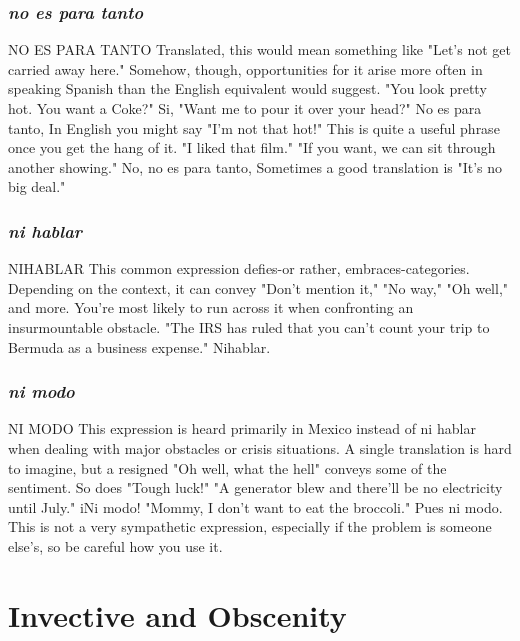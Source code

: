 \documentclass[14pt,a4paper,oneside]{memoir}
\begin{document}
\subsection{\emph{no es para tanto}}
NO ES PARA TANTO
Translated, this would mean something like "Let's not get carried away here." Somehow, though, opportunities for it arise more often in speaking Spanish than the English equivalent would suggest.
"You look pretty hot. You want a Coke?" Si, "Want me to pour it over
your head?" No es para tanto, In English you might say "I'm not that
hot!" This is quite a useful phrase once you get the hang of it. "I liked
that film." "If you want, we can sit through another showing." No, no
es para tanto, Sometimes a good translation is "It's no big deal."
\subsection{\emph{ni hablar}}
NIHABLAR
This common expression defies-or rather, embraces-categories. Depending on the context, it can convey "Don't mention it,"
"No way," "Oh well," and more. You're most likely to run across it
when confronting an insurmountable obstacle. "The IRS has ruled
that you can't count your trip to Bermuda as a business expense."
Nihablar.
\subsection{\emph{ni modo}}
NI MODO
This expression is heard primarily in Mexico instead of ni
hablar when dealing with major obstacles or crisis situations. A single
translation is hard to imagine, but a resigned "Oh well, what the hell"
conveys some of the sentiment. So does "Tough luck!" "A generator
blew and there'll be no electricity until July." iNi modo! "Mommy, I
don't want to eat the broccoli." Pues ni modo. This is not a very sympathetic expression, especially if the problem is someone else's, so be
careful how you use it.

\chapter{Invective and Obscenity}
\end{document}
